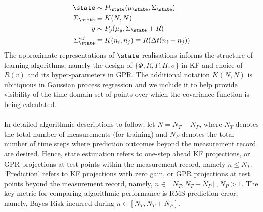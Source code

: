 \begin{align}
\state & \sim P_\state(\mu_\state,\Sigma_\state ) \\
\Sigma_\state & \equiv K(N,N) \\
y & \sim P_y(\mu_y,\Sigma_\state + R ) \\
\Sigma_\state^{i,j} & \equiv K(n_i, n_j) \equiv R(\Delta t(n_i - n_j))
\end{align}
The approximate representations of $\state$ realisations informs the structure of learning algorithms, namely the design of $\{\Phi, R, \Gamma, H, \sigma \} $ in KF and choice of $R(v)$ and its hyper-parameters in GPR. The additional notation $K(N,N)$ is ubitiquous in Gaussian process regression and we include it to help provide visibility of the time domain set of points over which the covariance function is being calculated. 
\\
\\
In detailed algorithmic descriptions to follow, let $N = N_{T} + N_{P}$, where $N_{T}$ denotes the total number of measurements (for training) and $N_{P}$ denotes the total number of time steps where prediction outcomes beyond the measurement record are desired. Hence, state estimation refers to one-step ahead KF projections, or GPR projections at test points within the measurement record, namely $n \leq N_T$. `Prediction' refers to KF projections with zero gain, or GPR projections at test points beyond the measurement record, namely, $n \in [N_T, N_T + N_P], N_P > 1$. The key metric for comparing algorithmic performance is RMS prediction error, namely, Bayes Risk incurred during $n \in [N_T, N_T + N_P]$.




